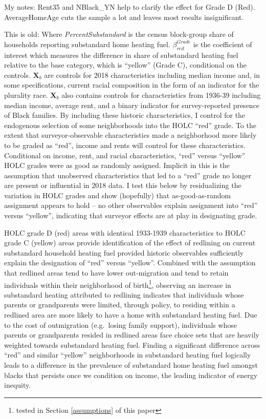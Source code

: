 \documentclass[
]{article}
\begin{document}
My notes: Rent35 and NBlack\_YN help to clarify the effect for Grade D (Red). AverageHomeAge cuts the sample a lot and leaves most results insignificant.

This is old: Where \textit{PercentSubstandard} is the census block-group share of households reporting substandard home heating fuel. \(\beta_{red}^{Grade}\) is the coefficient of interest which measures the difference in share of substandard heating fuel relative to the base category, which is ``yellow'' (Grade C), conditional on the controls. \(\mathbf{X}_b\) are controls for 2018 characteristics including median income and, in some specifications, current racial composition in the form of an indicator for the plurality race. \(\mathbf{X}_b\) also contains controls for characteristics from 1936-39 including median income, average rent, and a binary indicator for survey-reported presence of Black families. By including these historic characteristics, I control for the endogenous selection of some neighborhoods into the HOLC ``red'' grade. To the extent that surveyor-observable characteristics made a neighborhood more likely to be graded as ``red'', income and rents will control for these characteristics. Conditional on income, rent, and racial characteristics, ``red'' versus ``yellow'' HOLC grades were as good as randomly assigned. Implicit in this is the assumption that unobserved characteristics that led to a ``red'' grade no longer are present or influential in 2018 data. I test this below by residualizing the variation in HOLC grades and show (hopefully) that as-good-as-random assignment appears to hold -- no other observables explain assignment into ``red'' versus ``yellow'', indicating that surveyor effects are at play in designating grade.

HOLC grade D (red) areas with identical 1933-1939 characteristics to HOLC grade C (yellow) areas provide identification of the effect of redlining on current substandard household heating fuel provided historic observables sufficiently explain the designation of ``red'' versus ``yellow''. Combined with the assumption that redlined areas tend to have lower out-migration and tend to retain individuals within their neighborhood of birth\footnote{tested in Section \ref{assumptions} of this paper}, observing an increase in substandard heating attributed to redlining indicates that individuals whose parents or grandparents were limited, through policy, to residing within a redlined area are more likely to have a home with substandard heating fuel. Due to the cost of outmigration (e.g.~losing family support), individuals whose parents or grandparents resided in redlined areas face choice sets that are heavily weighted towards substandard heating fuel. Finding a significant difference across ``red'' and similar ``yellow'' neighborhoods in substandard heating fuel logically leads to a difference in the prevalence of substandard home heating fuel amongst blacks that persists once we condition on income, the leading indicator of energy inequity.
\end{document}
